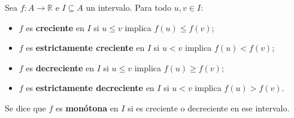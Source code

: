 \documentclass[10pt,a5paper]{article}
\begin{document}
\begin{definicion}
Sea $f:A\to\mathbb{R}$ e $I\subseteq A$ un intervalo. Para todo $u,v\in I$:
\begin{itemize}
  \item $f$ es \textbf{creciente} en $I$ si $u\leq v$ implica $f(u)\leq f(v)$;
  \item $f$ es \textbf{estrictamente creciente} en $I$ si $u<v$ implica $f(u)<f(v)$;
  \item $f$ es \textbf{decreciente} en $I$ si $u\leq v$ implica $f(u)\geq f(v)$;
  \item $f$ es \textbf{estrictamente decreciente} en $I$ si $u<v$ implica $f(u)>f(v)$.
\end{itemize}
Se dice que $f$ es \textbf{monótona} en $I$ si es creciente o decreciente en ese intervalo.


\end{definicion}
\end{document}
